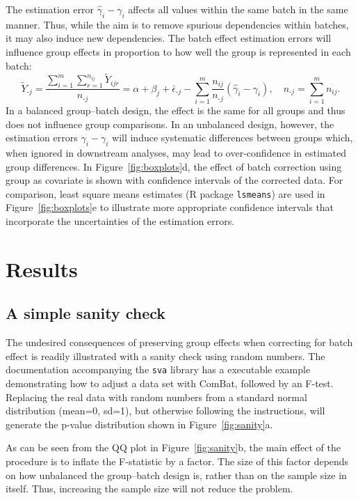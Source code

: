 \documentclass{bio}
\begin{document}
The estimation error $\hat\gamma_i-\gamma_i$ affects all values within the same batch in the same manner. Thus, while the aim is to remove spurious dependencies within batches, it may also induce new dependencies. The batch effect estimation errors will influence group effects in proportion to how well the group is represented in each batch:
\begin{equation}
\widetilde{Y}_{\textrm{-}j}
=\frac{\sum_{i=1}^m\sum_{r=1}^{n_{ij}}\widetilde{Y}_{ijr}}{n_{\textrm{-}j}}
=\alpha+\beta_j+\bar{\epsilon}_{\textrm{-}j}
  -\sum_{i=1}^m \frac{n_{ij}}{n_{\textrm{-}j}}(\hat{\gamma}_i-\gamma_i),
\quad
n_{\textrm{-}j}=\sum_{i=1}^m n_{ij}.
\end{equation}
In a balanced group--batch design, the effect is the same for all groups and thus does not influence group comparisons. In an unbalanced design, however, the estimation errors $\hat\gamma_i-\gamma_i$ will induce systematic differences between groups which, when ignored in downstream analyses, may lead to over-confidence in estimated group differences. In Figure~\ref{fig:boxplots}d, the effect of batch correction using group as covariate is shown with confidence intervals of the corrected data. For comparison, least square means estimates (R package \texttt{lsmeans}) are used in Figure~\ref{fig:boxplots}e to illustrate more appropriate confidence intervals that incorporate the uncertainties of the estimation errors.


\section{Results}

\subsection{A simple sanity check}

The undesired consequences of preserving group effects when correcting for batch effect is readily illustrated with a sanity check using random numbers. The documentation accompanying the \texttt{sva} library has a executable example demonstrating how to adjust a data set with ComBat, followed by an F-test. Replacing the real data with random numbers from a standard normal distribution (mean=0, sd=1), but otherwise following the instructions, will generate the p-value distribution shown in Figure~\ref{fig:sanity}a.

As can be seen from the QQ plot in Figure~\ref{fig:sanity}b, the main effect of the procedure is to inflate the F-statistic by a factor. The size of this factor depends on how unbalanced the group--batch design is, rather than on the sample size in itself. Thus, increasing the sample size will not reduce the problem.
\end{document}
